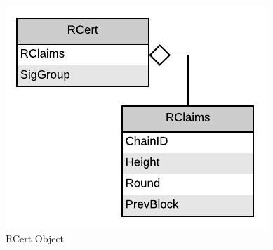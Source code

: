 \begin{figure}[H]
    \centering
    \includegraphics[scale=0.5]{figures/RCert_Object.pdf}
    \caption{RCert Object}
\end{figure}
